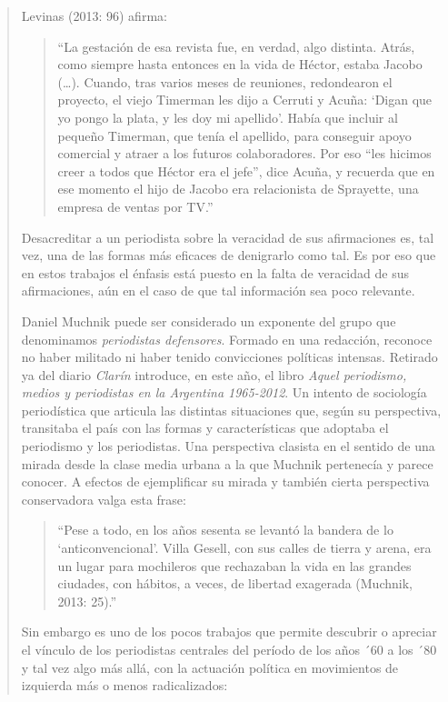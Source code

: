 \begin{quote}
Levinas (2013: 96) afirma:

\begin{quote}
	\enquote{La gestación de esa revista fue, en verdad, algo distinta. Atrás, como siempre hasta entonces en la vida de Héctor, estaba Jacobo (\dots). Cuando, tras varios meses de reuniones, redondearon el proyecto, el viejo Timerman les dijo a Cerruti y Acuña: \enquote{Digan que yo pongo la plata, y les doy mi apellido}. Había que incluir al pequeño Timerman, que tenía el apellido, para conseguir apoyo comercial y atraer a los futuros colaboradores. Por eso ``les hicimos creer a todos que Héctor era el jefe'', dice Acuña, y recuerda que en ese momento el hijo de Jacobo era relacionista de Sprayette, una empresa de ventas por TV.}
\end{quote}


Desacreditar a un periodista sobre la veracidad de sus afirmaciones es, tal vez, una de las formas más eficaces de denigrarlo como tal. Es por eso que en estos trabajos el énfasis está puesto en la falta de veracidad de sus afirmaciones, aún en el caso de que tal información sea poco relevante.

Daniel Muchnik puede ser considerado un exponente del grupo que denominamos \emph{periodistas defensores}. Formado en una redacción, reconoce no haber militado ni haber tenido convicciones políticas intensas. Retirado ya del diario \emph{Clarín} introduce, en este año, el libro \emph{Aquel periodismo, medios y periodistas en la Argentina 1965-2012}. Un intento de sociología periodística que articula las distintas situaciones que, según su perspectiva, transitaba el país con las formas y características que adoptaba el periodismo y los periodistas. Una perspectiva clasista en el sentido de una mirada desde la clase media urbana a la que Muchnik pertenecía y parece conocer. A efectos de ejemplificar su mirada y también cierta perspectiva conservadora valga esta frase:

\begin{quote}
	\enquote{Pese a todo, en los años sesenta se levantó la bandera de lo \enquote{anticonvencional}. Villa Gesell, con sus calles de tierra y arena, era un lugar para mochileros que rechazaban la vida en las grandes ciudades, con hábitos, a veces, de libertad exagerada (Muchnik, 2013: 25).}
\end{quote}


Sin embargo es uno de los pocos trabajos que permite descubrir o apreciar el vínculo de los periodistas centrales del período de los años ´60 a los ´80 y tal vez algo más allá, con la actuación política en movimientos de izquierda más o menos radicalizados:


\end{quote}
